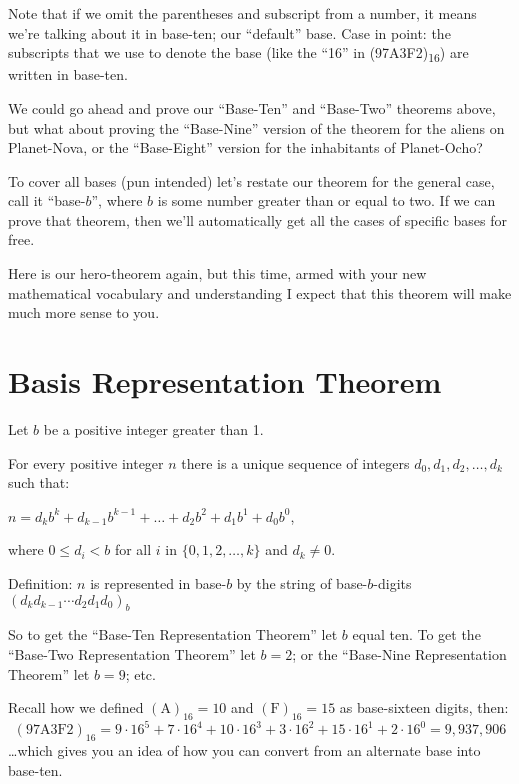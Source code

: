 \documentclass{article}
\newenvironment{jprIn}{\begin{adjustwidth}{2em}{}}{\end{adjustwidth}}
\begin{document}
Note that if we omit the parentheses and subscript from a number,
it means we're talking about it in base-ten; our ``default'' base.
Case in point: the subscripts that we use to denote the base
(like the ``16'' in (97A3F2)\textsubscript{16}) are written in base-ten.

We could go ahead and prove our ``Base-Ten'' and ``Base-Two'' theorems above,
but what about proving the ``Base-Nine'' version of the theorem for the aliens on Planet-Nova,
or the ``Base-Eight'' version for the inhabitants of Planet-Ocho?

To cover all bases (pun intended) let's restate our theorem for the general case,
call it ``base-$b$'',
where $b$ is some number greater than or equal to two.
If we can prove that theorem,
then we'll automatically get all the cases of specific bases for free.

Here is our hero-theorem again, but this time, armed with your new mathematical 
vocabulary and
understanding I expect that this theorem will make much more sense to you.

\section*{Basis Representation Theorem}
\begin{jprIn}
Let $b$ be a positive integer greater than 1.

For every positive integer $n$ there is a unique sequence
of integers $d_0, d_1, d_2,\dots{},d_k$ such that:

\hspace{3em}$n=d_kb^k+d_{k-1}b^{k-1}+\dots+d_2b^2+d_1b^1+d_0b^0$,

where $0\le{}d_i<b$ for all $i$ in $\{0,1,2,\dots{},k\}$ and $d_k\ne0$.

Definition: $n$ is represented in base-$b$ by the string
of base-$b$-digits $(d_kd_{k-1}{\cdots}d_2d_1d_0)_b$
\end{jprIn}
\bigskip

So to get the ``Base-Ten Representation Theorem'' let $b$ equal ten.
To get the ``Base-Two Representation Theorem'' let $b=2$; or the ``Base-Nine Representation Theorem''
let $b=9$; etc.

Recall how we defined $(\text{A})_{16}=10$
and $(\text{F})_{16}=15$ as base-sixteen digits, then:
\[
(\text{97A3F2})_{16}
=9\cdot{}16^5
+7\cdot{}16^4
+10\cdot{}16^3
+3\cdot{}16^2
+15\cdot{}16^1
+2\cdot{}16^0
=9,937,906\]
\dots{}which gives you an idea of how you can convert from an alternate base into base-ten.
\end{document}
